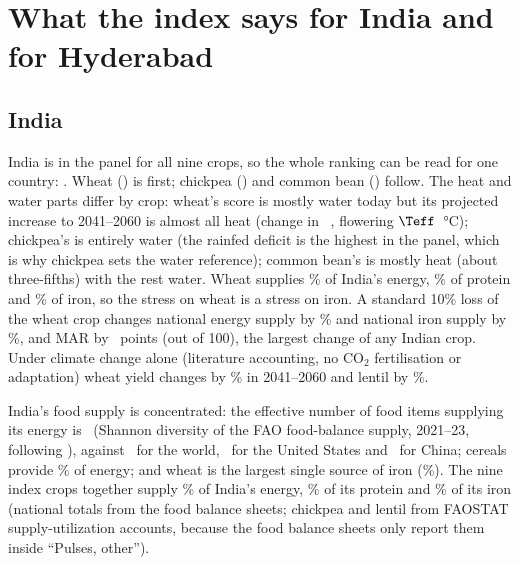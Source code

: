 \section{What the index says for India and for Hyderabad}\label{sec:india}

\subsection{India}
India is in the panel for all nine crops, so the whole ranking can be read for one country: \indOrder.
Wheat (\indWheatFFour) is first; chickpea (\indChickpeaFFour) and common bean (\indBeanFFour) follow. The heat
and water parts differ by crop: wheat's score is mostly water today but its projected increase to 2041--2060
is almost all heat (change in \Fd\ \indWheatdFFour, flowering $\Teff$ \indWheatdTeff\,\si{\celsius}); chickpea's
is entirely water (the rainfed deficit is the highest in the panel, which is why chickpea sets the water
reference); common bean's is mostly heat (about three-fifths) with the rest water. Wheat supplies \indWheatShKcal\% of
India's energy, \indWheatShProtein\% of protein and \indWheatShIron\% of iron, so the stress on wheat is a
stress on iron. A standard 10\% loss of the wheat crop changes national energy supply by \indWheatShockKcal\% and national
iron supply by \indWheatShockIron\%, and MAR by \indWheatShockMar\ points (out of 100), the largest change of
any Indian crop. Under climate change alone (literature accounting, no CO$_2$ fertilisation or adaptation) wheat
yield changes by \indWheatdY\% in 2041--2060 and lentil by \indLentildY\%.

India's food supply is concentrated: the effective number of food items supplying its energy is \divIndKcal\
(Shannon diversity of the FAO food-balance supply, 2021--23, following \citealp{remans2014}), against \divWorldKcal\ for the world, \divUsaKcal\
for the United States and \divChnKcal\ for China; cereals provide \divIndCereal\% of energy; and wheat is the
largest single source of iron (\divIndIronTopShare\%). The nine index crops together supply \divIndNineKcal\% of India's energy,
\divIndNineProtein\% of its protein and \divIndNineIron\% of its iron (national totals from the food balance sheets; chickpea
and lentil from FAOSTAT supply-utilization accounts, because the food balance sheets only report them inside ``Pulses, other'').

